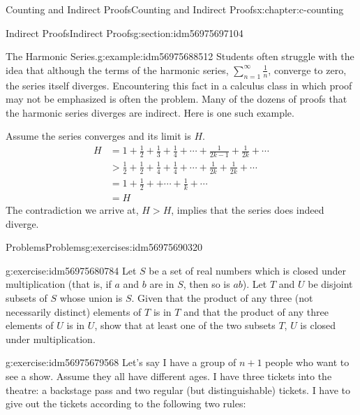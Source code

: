 \documentclass[twoside,10pt,]{book}
\numberwithin{equation}{section}
\newcommand{\gt}{>}
\begin{document}
\begin{chapterptx}{Counting and Indirect Proofs}{}{Counting and Indirect Proofs}{}{}{x:chapter:c-counting}
\begin{sectionptx}{Indirect Proofs}{}{Indirect Proofs}{}{}{g:section:idm56975697104}
\begin{example}{The Harmonic Series.}{g:example:idm56975688512}%
%
Students often struggle with the idea that although the terms of the harmonic series, \(\sum_{n=1}^{\infty} \frac{1}{n}\), converge to zero, the series itself diverges. Encountering this fact in a calculus class in which proof may not be emphasized is often the problem.  Many of the dozens of proofs that the harmonic series diverges are indirect.  Here is one such example.%
\par
Assume the series converges and its limit is \(H\).%
\begin{equation*}
\begin{split}
H &= 1 + \frac{1}{2} + \frac{1}{3} + \frac{1}{4} +\cdots + \frac{1}{2k-1} + \frac{1}{2k} + \cdots\\
& \gt  \frac{1}{2} + \frac{1}{2} + \frac{1}{4} + \frac{1}{4} +\cdots + \frac{1}{2k} + \frac{1}{2k} + \cdots\\
& = 1 + \frac{1}{2} +  +\cdots + \frac{1}{k}  + \cdots\\
& = H
\end{split}
\end{equation*}
The contradiction we arrive at, \(H \gt H\), implies that the series does indeed diverge.%
\end{example}
\end{sectionptx}
%
%
\typeout{************************************************}
\typeout{************************************************}
%
\begin{exercises-section}{Problems}{}{Problems}{}{}{g:exercises:idm56975690320}
\begin{divisionexercise}{1}{}{}{g:exercise:idm56975680784}%
Let \(S\) be a set of real numbers which is closed under multiplication (that is, if \(a\) and \(b\) are in \(S\), then so is \(a b\)). Let \(T\) and \(U\) be disjoint subsets of \(S\) whose union is \(S\). Given that the product of any three (not necessarily distinct) elements of \(T\) is in \(T\) and that the product of any three elements of \(U\) is in \(U\), show that at least one of the two subsets \(T\), \(U\) is closed under multiplication.%
\end{divisionexercise}%
\begin{divisionexercise}{2}{}{}{g:exercise:idm56975679568}%
Let's say I have a group of \(n+1\) people who want to see a show. Assume they all have different ages.  I have three tickets into the theatre: a backstage pass and two regular (but distinguishable) tickets. I have to give out the tickets according to the following two rules:%

\end{divisionexercise}
\end{exercises-section}
\end{chapterptx}
\end{document}
